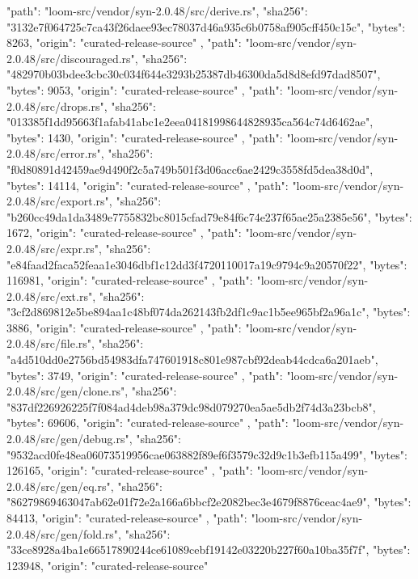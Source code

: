 {    {
      "path": "loom-src/vendor/syn-2.0.48/src/derive.rs",
      "sha256": "3132e7f064725c7ca43f26daee93ec78037d46a935c6b0758af905cff450c15c",
      "bytes": 8263,
      "origin": "curated-release-source"
    },
    {
      "path": "loom-src/vendor/syn-2.0.48/src/discouraged.rs",
      "sha256": "482970b03bdee3cbc30c034f644e3293b25387db46300da5d8d8efd97dad8507",
      "bytes": 9053,
      "origin": "curated-release-source"
    },
    {
      "path": "loom-src/vendor/syn-2.0.48/src/drops.rs",
      "sha256": "013385f1dd95663f1afab41abc1e2eea04181998644828935ca564c74d6462ae",
      "bytes": 1430,
      "origin": "curated-release-source"
    },
    {
      "path": "loom-src/vendor/syn-2.0.48/src/error.rs",
      "sha256": "f0d80891d42459ae9d490f2c5a749b501f3d06acc6ae2429c3558fd5dea38d0d",
      "bytes": 14114,
      "origin": "curated-release-source"
    },
    {
      "path": "loom-src/vendor/syn-2.0.48/src/export.rs",
      "sha256": "b260cc49da1da3489e7755832bc8015cfad79e84f6c74e237f65ae25a2385e56",
      "bytes": 1672,
      "origin": "curated-release-source"
    },
    {
      "path": "loom-src/vendor/syn-2.0.48/src/expr.rs",
      "sha256": "e84faad2faca52feaa1e3046dbf1c12dd3f4720110017a19c9794c9a20570f22",
      "bytes": 116981,
      "origin": "curated-release-source"
    },
    {
      "path": "loom-src/vendor/syn-2.0.48/src/ext.rs",
      "sha256": "3cf2d869812e5be894aa1c48bf074da262143fb2df1c9ac1b5ee965bf2a96a1c",
      "bytes": 3886,
      "origin": "curated-release-source"
    },
    {
      "path": "loom-src/vendor/syn-2.0.48/src/file.rs",
      "sha256": "a4d510dd0e2756bd54983dfa747601918c801e987cbf92deab44cdca6a201aeb",
      "bytes": 3749,
      "origin": "curated-release-source"
    },
    {
      "path": "loom-src/vendor/syn-2.0.48/src/gen/clone.rs",
      "sha256": "837df226926225f7f084ad4deb98a379dc98d079270ea5ae5db2f74d3a23bcb8",
      "bytes": 69606,
      "origin": "curated-release-source"
    },
    {
      "path": "loom-src/vendor/syn-2.0.48/src/gen/debug.rs",
      "sha256": "9532acd0fe48ea06073519956cae063882f89ef6f3579c32d9c1b3efb115a499",
      "bytes": 126165,
      "origin": "curated-release-source"
    },
    {
      "path": "loom-src/vendor/syn-2.0.48/src/gen/eq.rs",
      "sha256": "86279869463047ab62e01f72e2a166a6bbcf2e2082bec3e4679f8876ceac4ae9",
      "bytes": 84413,
      "origin": "curated-release-source"
    },
    {
      "path": "loom-src/vendor/syn-2.0.48/src/gen/fold.rs",
      "sha256": "33ce8928a4ba1e66517890244ce61089cebf19142e03220b227f60a10ba35f7f",
      "bytes": 123948,
      "origin": "curated-release-source"
}}
